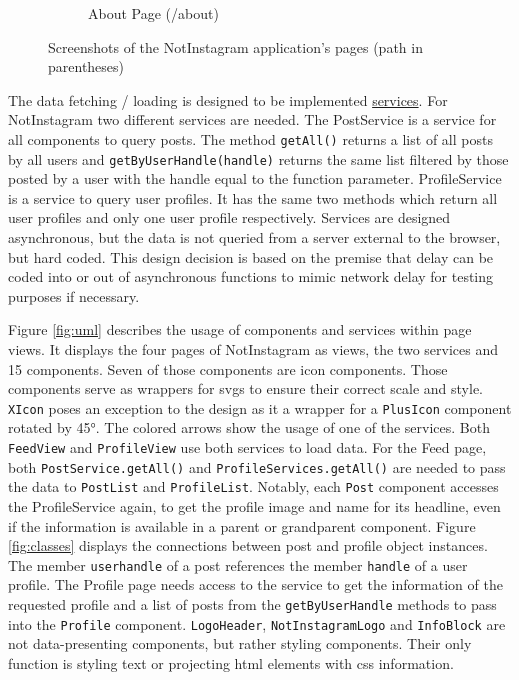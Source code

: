 \documentclass[a4paper, fontsize=11pt]{article}
\begin{document}
\begin{figure}[ht!]
\begin{subfigure}{0.49\linewidth}
\begin{center}
    \end{center}
    \caption{About Page (/about)}\label{subfig:about}
  \end{subfigure}
  \caption{Screenshots of the NotInstagram application's pages (path in parentheses)}\label{fig:screenshots}
\end{figure}

The data fetching / loading is designed to be implemented \hyperref[enum:services]{services}.
For NotInstagram two different services are needed.
The PostService is a service for all components to query posts.
The method \verb|getAll()| returns a list of all posts by all users and \verb|getByUserHandle(handle)| returns the same list filtered by those posted by a user with the handle equal to the function parameter.
ProfileService is a service to query user profiles.
It has the same two methods which return all user profiles and only one user profile respectively.
Services are designed asynchronous, but the data is not queried from a server external to the browser, but hard coded.
This design decision is based on the premise that delay can be coded into or out of asynchronous functions to mimic network delay for testing purposes if necessary.

Figure \ref{fig:uml} describes the usage of components and services within page views.
It displays the four pages of NotInstagram as views, the two services and 15 components.
Seven of those components are icon components.
Those components serve as wrappers for \acrshort{svg}s to ensure their correct scale and style.
\verb|XIcon| poses an exception to the design as it a wrapper for a \verb|PlusIcon| component rotated by 45°.
The colored arrows show the usage of one of the services.
Both \verb|FeedView| and \verb|ProfileView| use both services to load data.
For the Feed page, both \verb|PostService.getAll()| and \verb|ProfileServices.getAll()| are needed to pass the data to \verb|PostList| and \verb|ProfileList|.
Notably, each \verb|Post| component accesses the ProfileService again, to get the profile image and name for its headline, even if the information is available in a parent or grandparent component.
Figure \ref{fig:classes} displays the connections between post and profile object instances.
The member \verb|userhandle| of a post references the member \verb|handle| of a user profile.
The Profile page needs access to the service to get the information of the requested profile and a list of posts from the \verb|getByUserHandle| methods to pass into the \verb|Profile| component.
\verb|LogoHeader|, \verb|NotInstagramLogo| and \verb|InfoBlock| are not data-presenting components, but rather styling components.
Their only function is styling text or projecting \acrshort{html} elements with \acrshort{css} information.
\end{document}
